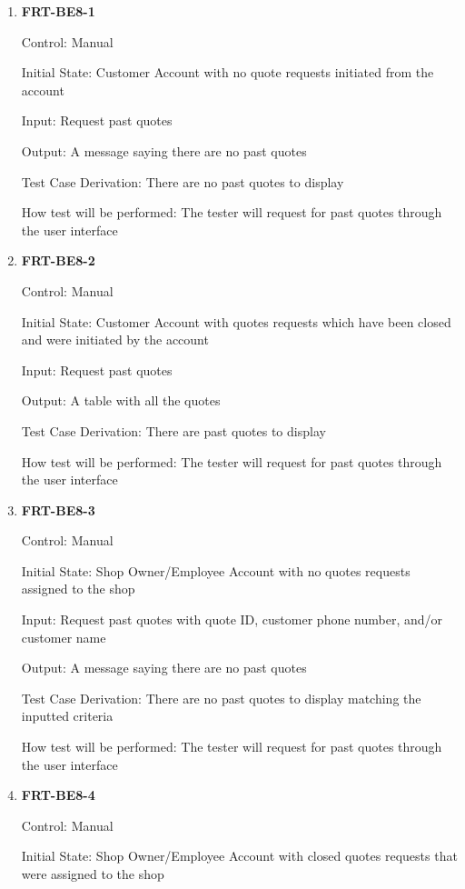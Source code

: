 \documentclass[12pt, titlepage]{article}
\begin{document}
\begin{enumerate}
	\item \textbf{FRT-BE8-1}

	      Control: Manual

	      Initial State: Customer Account with no quote requests initiated from the account

	      Input: Request past quotes

	      Output: A message saying there are no past quotes

	      Test Case Derivation: There are no past quotes to display

	      How test will be performed: The tester will request for past quotes through the user interface

	\item \textbf{FRT-BE8-2}

	      Control: Manual

	      Initial State: Customer Account with quotes requests which have been closed and were initiated by
	      the account

	      Input: Request past quotes

	      Output: A table with all the quotes

	      Test Case Derivation: There are past quotes to display

	      How test will be performed: The tester will request for past quotes through the user interface

	\item \textbf{FRT-BE8-3}

	      Control: Manual

	      Initial State: Shop Owner/Employee Account with no quotes requests assigned to the shop

	      Input: Request past quotes with quote ID, customer phone number, and/or customer name

	      Output: A message saying there are no past quotes

	      Test Case Derivation: There are no past quotes to display matching the inputted criteria

	      How test will be performed: The tester will request for past quotes through the user interface

	\item \textbf{FRT-BE8-4}

	      Control: Manual

	      Initial State: Shop Owner/Employee Account with closed quotes requests that were assigned to the
	      shop


\end{enumerate}
\end{document}
